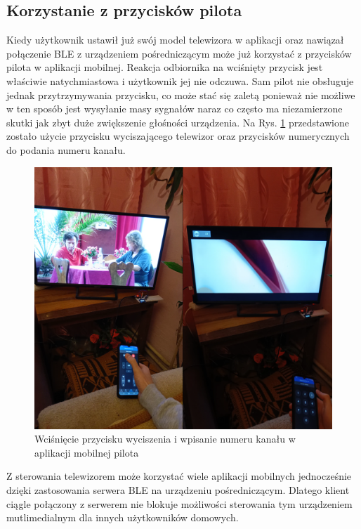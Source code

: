 \documentclass[12pt,twoside,draft]{article}
\begin{document}
\subsection{Korzystanie z przycisków pilota}
Kiedy użytkownik ustawił już swój model telewizora w aplikacji oraz nawiązał połączenie BLE z urządzeniem pośredniczącym może już korzystać z przycisków pilota w aplikacji mobilnej. Reakcja odbiornika na wciśnięty przycisk jest właściwie natychmiastowa i użytkownik jej nie odczuwa. Sam pilot nie obsługuje jednak przytrzymywania przycisku, co może stać się zaletą ponieważ nie możliwe w ten sposób jest wysyłanie masy sygnałów naraz co często ma niezamierzone skutki jak zbyt duże zwiększenie głośności urządzenia. Na Rys. \ref*{Fig:buttonsTest} przedstawione zostało użycie przycisku wyciszającego telewizor oraz przycisków numerycznych do podania numeru kanału.

\begin{figure}[ht]
   \centering
   \includegraphics[width=13cm]{images/buttonsTest.png}
   \caption{Wciśnięcie przycisku wyciszenia i wpisanie numeru kanału w aplikacji mobilnej pilota}
   \label{Fig:buttonsTest}
\end{figure}

Z sterowania telewizorem może korzystać wiele aplikacji mobilnych jednocześnie dzięki zastosowania serwera BLE na urządzeniu pośredniczącym. Dlatego klient ciągle połączony z serwerem nie blokuje możliwości sterowania tym urządzeniem mutlimedialnym dla innych użytkowników domowych.
\end{document}
